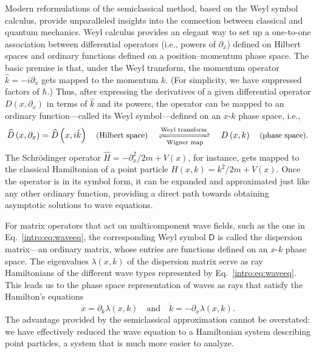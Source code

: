 Modern reformulations of the semiclassical method, based on the Weyl symbol calculus, provide unparalleled insights into the connection between classical and quantum mechanics.
Weyl calculus provides an elegant way to set up a one-to-one association between differential operators (i.e., powers of $\partial_{x}$) defined on Hilbert spaces and ordinary functions defined on a position--momentum phase space.
The basic premise is that, under the Weyl transform, the momentum operator $\hat{k} = -i\partial_{x}$ gets mapped to the momentum $k$.
(For simplicity, we have suppressed factors of $\hbar$.)
Thus, after expressing the derivatives of a given differential operator $D(x, \partial_{x})$ in terms of $\hat{k}$ and its powers, the operator can be mapped to an ordinary function---called its Weyl symbol---defined on an $x$-$k$ phase space, i.e.,
%
\begin{equation}
  \widehat{D}\left(x, \partial_{x}\right) = \widehat{D}\left(x, i\hat{k}\right) \quad\text{\small(Hilbert space)} \quad\xrightleftharpoons[\text{Wigner map}]{\text{Weyl transform}}\quad D\left(x, k\right) \quad\text{\small(phase space)}.
\end{equation}
%
The Schr\"{o}dinger operator $\widehat{H} = -\partial_{x}^{2}/2m + V(x)$, for instance, gets mapped to the classical Hamiltonian of a point particle $H(x, k) = k^{2}/2m + V(x)$.
Once the operator is in its symbol form, it can be expanded and approximated just like any other ordinary function, providing a direct path towards obtaining asymptotic solutions to wave equations.

For matrix operators that act on multicomponent wave fields, such as the one in Eq.~\eqref{intro:eq:waveeq}, the corresponding Weyl symbol $\mathsf{D}$ is called the dispersion matrix---an ordinary matrix, whose entries are functions defined on an $x$-$k$ phase space.
The eigenvalues $\lambda(x, k)$ of the dispersion matrix serve as ray Hamiltonians of the different wave types represented by Eq.~\eqref{intro:eq:waveeq}.
This leads us to the phase space representation of waves as rays that satisfy the Hamilton's equations
%
\begin{equation}
\dot{x} = \partial_{k}\lambda(x,k)
\quad\text{and}\quad
\dot{k} = -\partial_{x}\lambda(x, k).
\end{equation}
%
The advantage provided by the semiclassical approximation cannot be overstated: we have effectively reduced the wave equation to a Hamiltonian system describing point particles, a system that is much more easier to analyze.

